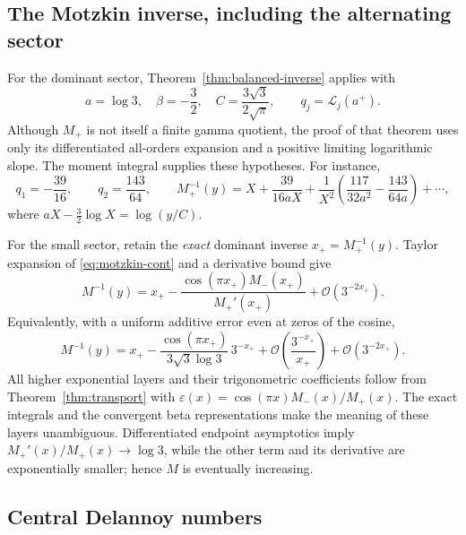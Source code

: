 \documentclass[11pt,a4paper]{article}
\numberwithin{equation}{section}
\theoremstyle{definition}
\theoremstyle{remark}
\newcommand{\cL}{\mathcal L}
\newcommand{\bigO}{\mathcal O}
\begin{document}
\subsection{The Motzkin inverse, including the alternating sector}

For the dominant sector, Theorem~\ref{thm:balanced-inverse} applies with
\[
 a=\log3,\quad\beta=-\frac32,\quad C=\frac{3\sqrt3}{2\sqrt\pi},
 \qquad q_j=\cL_j(a^+).
\]
Although $M_+$ is not itself a finite gamma quotient, the proof of that theorem uses only its differentiated all-orders expansion and a positive limiting logarithmic slope. The moment integral supplies these hypotheses. For instance,
\[
 q_1=-\frac{39}{16},\qquad q_2=\frac{143}{64},\qquad
 M_+^{-1}(y)=X+\frac{39}{16aX}
  +\frac1{X^2}\left(\frac{117}{32a^2}-\frac{143}{64a}\right)+\cdots,
\]
where $aX-\tfrac32\log X=\log(y/C)$.

For the small sector, retain the \emph{exact} dominant inverse $x_+=M_+^{-1}(y)$. Taylor expansion of \eqref{eq:motzkin-cont} and a derivative bound give
\begin{equation}
 M^{-1}(y)=x_+-\frac{\cos(\pi x_+)M_-(x_+)}{M_+'(x_+)}
                +\bigO(3^{-2x_+}).
 \label{eq:motzkin-inverse-exact}
\end{equation}
Equivalently, with a uniform additive error even at zeros of the cosine,
\begin{equation}
 M^{-1}(y)=x_+-\frac{\cos(\pi x_+)}{3\sqrt3\log3}\,3^{-x_+}
 +\bigO\!\left(\frac{3^{-x_+}}{x_+}\right)
 +\bigO(3^{-2x_+}).
 \label{eq:motzkin-inverse-leading}
\end{equation}
All higher exponential layers and their trigonometric coefficients follow from Theorem~\ref{thm:transport} with
$\varepsilon(x)=\cos(\pi x)M_-(x)/M_+(x)$. The exact integrals and the convergent beta representations make the meaning of these layers unambiguous. Differentiated endpoint asymptotics imply $M_+'(x)/M_+(x)\to\log3$, while the other term and its derivative are exponentially smaller; hence $M$ is eventually increasing.

\subsection{Central Delannoy numbers}
\end{document}
